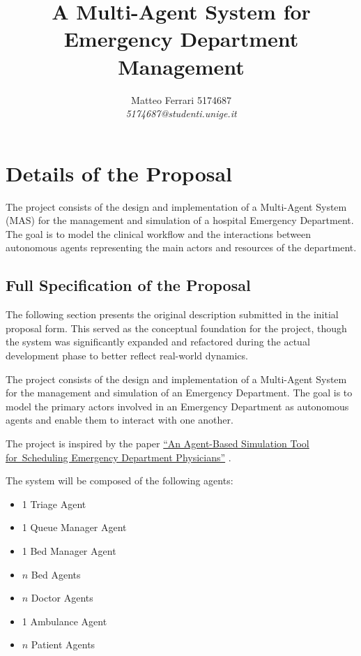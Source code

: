 \documentclass{article}[12pt]
\begin{document}
\title{A Multi-Agent System for Emergency Department Management}
\author{Matteo Ferrari 5174687\\
{\em 5174687@studenti.unige.it}}

\date{}
\maketitle             
\tableofcontents
\newpage
\section{Details of the Proposal}
\label{sec:yourProposal}

\noindent
The project consists of the design and implementation of a Multi-Agent System (MAS) for the management and simulation of a hospital Emergency Department. The goal is to model the clinical workflow and the interactions between autonomous agents representing the main actors and resources of the department. 

\subsection{Full Specification of the Proposal}
\label{subsec:specification}

\noindent
The following section presents the original description submitted in the initial proposal form. This served as the conceptual foundation for the project, though the system was significantly expanded and refactored during the actual development phase to better reflect real-world dynamics.

\vspace{\baselineskip}

\noindent
The project consists of the design and implementation of a Multi-Agent System for the management and simulation of an Emergency Department. The goal is to model the primary actors involved in an Emergency Department as autonomous agents and enable them to interact with one another.

\noindent
The project is inspired by the paper \href{https://pmc.ncbi.nlm.nih.gov/articles/PMC2656074/}{``An Agent-Based Simulation Tool for\allowbreak\ Scheduling Emergency Department Physicians''} \cite{jones2008agent}.

\noindent
The system will be composed of the following agents:
\begin{itemize}
\item 1 Triage Agent
\item 1 Queue Manager Agent
\item 1 Bed Manager Agent
\item $n$ Bed Agents
\item $n$ Doctor Agents
\item 1 Ambulance Agent
\item $n$ Patient Agents
\end{itemize}
\end{document}
